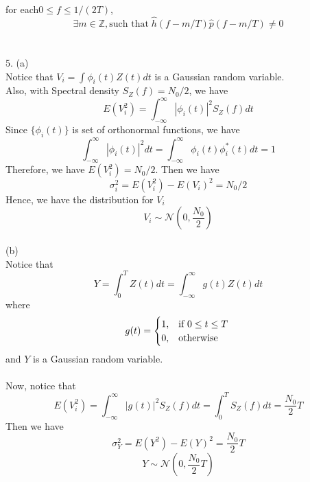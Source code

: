 \documentclass [12pt] {article}
\begin{document}
\begin{spacing}{1.5}
for each$ 0 \leq f \leq 1/(2T)$, $$\exists m \in \mathbb{Z}, \text{such that} \; \hat{h}(f-m/T)\hat{p}(f-m/T) \neq 0$$
~\\
\pagebreak
~\\
5. (a)\\
Notice that  $V_i = \int \phi_i(t)Z(t)dt$ is a Gaussian random variable.\\
Also, with Spectral density $S_Z(f)= N_0/2$, we have $$ E(V_i ^2) = \int_{-\infty}^{\infty}|\phi_i(t)|^2 S_Z(f) dt$$
Since $\{\phi_i(t)\}$ is set of orthonormal functions, we have 
$$ \int_{-\infty}^{\infty}|\phi_i(t)|^2 dt = \int_{-\infty}^{\infty}\phi_i(t) \phi_i^*(t) dt = 1$$
Therefore, we have $E(V_i^2) = N_0/2$.
Then we have $$\sigma_i^2 = E(V_i^2) - E(V_i)^2 = N_0/2 $$
Hence, we have the distribution for $V_i$
$$ V_i\sim \mathcal{N}(0, \frac{N_0}{2})$$
~\\
(b)\\
Notice that  
$$Y= \int_0^T Z(t)dt = \int_{-\infty}^{\infty} g(t)Z(t)dt $$
where
$$
g(t) = \begin{cases}
    1, & \text{if } 0 \leq t \leq T\\
    0,  & \text{otherwise}
\end{cases}\\
$$
and $Y$ is a Gaussian random variable.\\
~\\
Now, notice that
$$  E(V_i ^2) = \int_{-\infty}^{\infty}|g(t)|^2 S_Z(f) dt = \int_0^T S_Z(f) dt =  \frac{N_0}{2}T$$
Then we have
$$\sigma_Y^2 = E(Y^2) - E(Y)^2 = \frac{N_0}{2}T $$
$$ Y\sim \mathcal{N}(0, \frac{N_0}{2}T)$$
~\\

\end{spacing}
\end{document}
